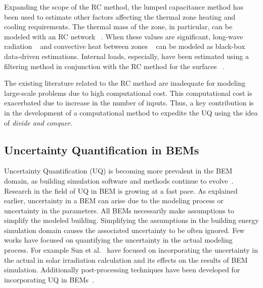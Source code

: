 Expanding the scope of the RC method, the lumped capacitance method has been used to estimate other factors affecting the thermal zone heating and cooling requirements.  The thermal mass of the zone, in particular, can be modeled with an RC network ~\citep{perera2014modeling,wang2006parameter}.  When these values are significant, long-wave radiation ~\citep{he2016simplified} and convective heat between zones ~\citep{goyal2011identification} can be modeled as black-box data-driven estimations.  Internal loads, especially, have been estimated using a filtering method in conjunction with the RC method for the surfaces ~\citep{o2010model}.

The existing literature related to the RC method are inadequate for modeling large-scale problems due to high computational cost. This computational cost is exacerbated due to increase in the number of inputs. Thus, a key contribution is in the development of a computational method to expedite the UQ using the idea of \textit{divide and conquer}.  


\subsection{Uncertainty Quantification in BEMs}

Uncertainty Quantification (UQ) is becoming more prevalent in the BEM domain, as building simulation software and methods continue to evolve~\citep{woloszyn2017treating}. Research in the field of UQ in BEM is growing at a fast pace. As explained earlier, uncertainty in a BEM can arise due to the modeling process or uncertainty in the parameters. All BEMs necessarily make assumptions to simplify the modeled building. Simplifying the assumptions in the building energy simulation domain causes the associated uncertainty to be often ignored. Few works have focused on quantifying the uncertainty in the actual modeling process. For example Sun et al.~\citep{sun2015quantification} have focused on incorporating the uncertainty in the actual in solar irradiation calculation and its effects on the results of BEM simulation. Additionally post-processing techniques have been developed for incorporating UQ in BEMs~\citep{ding2015uncertainty}. 

